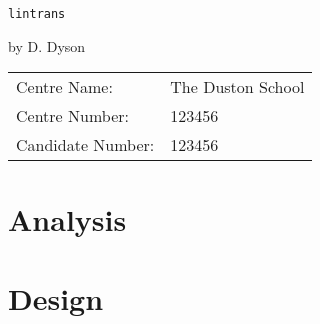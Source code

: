 \documentclass[a4paper]{article}
\begin{document}

\begin{center}
	\vspace*{6.5cm}

	\Huge{\texttt{lintrans}}

	\vspace{0.8cm}

	\Large{by D. Dyson}

	\vfill
\end{center}

\large{
\begin{tabular}{ll}
Centre Name:& The Duston School\\
Centre Number:& 123456\\
Candidate Number:& 123456
\end{tabular}
}

\thispagestyle{empty}
\newpage



\thispagestyle{fancy}
\cfoot{\thepage}

\tableofcontents
\newpage



\setlength{\parindent}{0em}
\setlength{\parskip}{1em}



\section{Analysis\label{section:analysis}}


\newpage

\section{Design\label{section:design}}




\newpage

\end{document}
